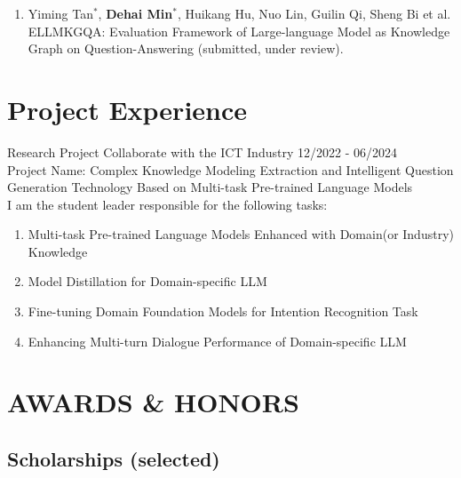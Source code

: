 \documentclass[a4paper,12pt]{article}
\begin{document}
\begin{enumerate}

\item Yiming Tan$^*$, \textbf{Dehai Min}$^*$, Huikang Hu, Nuo Lin, Guilin Qi, Sheng Bi et al. ELLMKGQA: Evaluation Framework of Large-language Model as Knowledge Graph on
Question-Answering (submitted, under review).

\end{enumerate}



\section{Project Experience}


Research Project Collaborate with the ICT Industry  \hfill 12/2022 - 06/2024 \vspace{0.1cm} \\
Project Name: Complex Knowledge Modeling Extraction and Intelligent Question Generation Technology Based on Multi-task Pre-trained Language Models \vspace{0.1cm} \\
I am the student leader responsible for the following tasks:
\begin{enumerate}
\item Multi-task Pre-trained Language Models Enhanced with Domain(or Industry) Knowledge 
\item Model Distillation for Domain-specific LLM
\item Fine-tuning Domain Foundation Models for Intention Recognition Task
\item Enhancing Multi-turn Dialogue Performance of Domain-specific LLM

\end{enumerate}

\section{AWARDS \& HONORS}

\subsection*{Scholarships (selected)}
\end{document}
